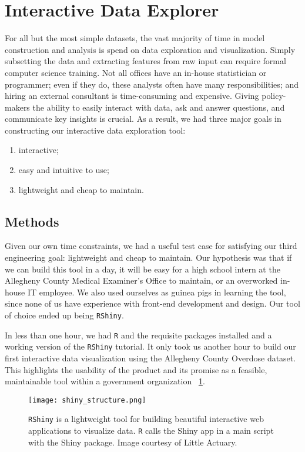 \documentclass{article}
\begin{document}
\section{Interactive Data Explorer}
For all but the most simple datasets, the vast majority of time in model construction and analysis is spend on data exploration and visualization. Simply subsetting the data and extracting features from raw input can require formal computer science training. Not all offices have an in-house statistician or programmer; even if they do, these analysts often have many responsibilities; and hiring an external consultant is time-consuming and expensive. Giving policy-makers the ability to easily interact with data, ask and answer questions, and communicate key insights is crucial. As a result, we had three major goals in constructing our interactive data exploration tool:
\begin{enumerate}
\item interactive;
\item easy and intuitive to use;
\item lightweight and cheap to maintain.
\end{enumerate}

\subsection{Methods}
Given our own time constraints, we had a useful test case for satisfying our third engineering goal: lightweight and cheap to maintain. Our hypothesis was that if we can build this tool in a day, it will be easy for a high school intern at the Allegheny County Medical Examiner's Office to maintain, or an overworked in-house IT employee. We also used ourselves as guinea pigs in learning the tool, since none of us have experience with front-end development and design. Our tool of choice ended up being \texttt{RShiny}.

In less than one hour, we had \texttt{R} and the requisite packages installed and a working version of the \texttt{RShiny} tutorial. It only took us another hour to build our first interactive data visualization using the Allegheny County Overdose dataset. This highlights the usability of the product and its promise as a feasible, maintainable tool within a government organization ~\ref{fig:shiny_structure}.

\begin{figure}[h]
\centering
\texttt{[image: shiny\_structure.png]}
\caption{\texttt{RShiny} is a lightweight tool for building beautiful interactive web applications to visualize data. \texttt{R} calls the Shiny app in a main script with the Shiny package. Image courtesy of Little Actuary.}
\label{fig:shiny_structure}
\end{figure}
 
\end{document}
